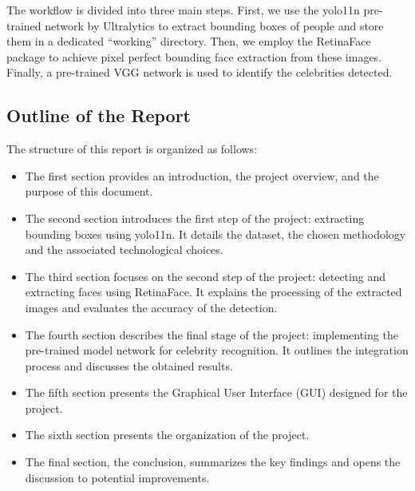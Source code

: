 \documentclass[a4paper,12pt]{article}
\begin{document}
The workflow is divided into three main steps. First, we use the yolo11n pre-trained network by Ultralytics to extract bounding boxes of people and store them in a dedicated “working” directory. Then, we employ the RetinaFace package to achieve pixel perfect bounding face extraction from these images. Finally, a pre-trained VGG network is used to identify the celebrities detected.

\subsection{Outline of the Report}

The structure of this report is organized as follows:

\begin{itemize}
    \item The first section provides an introduction, the project overview, and the purpose of this document.
    
    \item The second section introduces the first step of the project: extracting bounding boxes using yolo11n. It details the dataset, the chosen methodology and the associated technological choices.

    \item The third section focuses on the second step of the project: detecting and extracting faces using RetinaFace. It explains the processing of the extracted images and evaluates the accuracy of the detection.

    \item The fourth section describes the final stage of the project: implementing the pre-trained model network for celebrity recognition. It outlines the integration process and discusses the obtained results.

    \item The fifth section presents the Graphical User Interface (GUI) designed for the project.

    \item The sixth section presents the organization of the project.

    \item The final section, the conclusion, summarizes the key findings and opens the discussion to potential improvements.

    
\end{itemize}




\newpage
\end{document}

